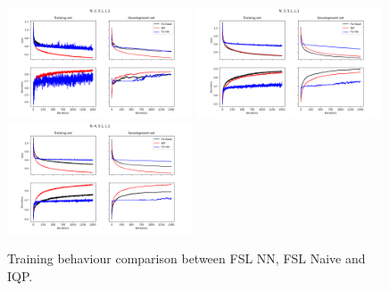 \begin{figure}[ht]%
\centering
\includegraphics[width=0.49\textwidth]{figures/comparison3/Epochs_1500--A_0.05--N_2--S_1--L_1.png}
\includegraphics[width=0.49\textwidth]{figures/comparison3/Epochs_1500--A_0.05--N_3--S_1--L_1.png}
\includegraphics[width=0.49\textwidth]{figures/comparison3/Epochs_1500--A_0.05--N_4--S_1--L_1.png}
\label{fig:2spread} 
\caption[Comparison between three \mya for bigger datasets]{Training behaviour comparison between FSL NN, FSL Naive and IQP.}
\end{figure}
